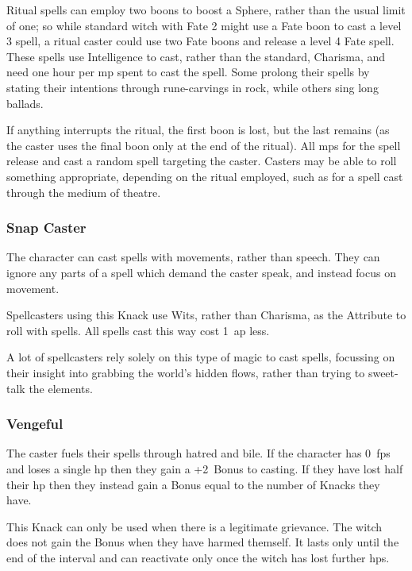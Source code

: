 \begin{multicols}{2}
Ritual spells can employ two \glspl{boon} to boost a Sphere, rather than the usual limit of one; so while standard \gls{witch} with Fate 2 might use a Fate \gls{boon} to cast a level 3 spell, a ritual caster could use two Fate \glspl{boon} and release a level 4 Fate spell.
These spells use Intelligence to cast, rather than the standard, Charisma, and need one hour per \gls{mp} spent to cast the spell.
Some prolong their spells by stating their intentions through rune-carvings in rock, while others sing long ballads.

If anything interrupts the ritual, the first \gls{boon} is lost, but the last remains (as the caster uses the final \gls{boon} only at the end of the ritual).
All \glspl{mp} for the spell release and cast a random spell targeting the caster.
Casters may be able to roll something appropriate, depending on the ritual employed, such as  for a spell cast through the medium of theatre.

\subsubsection{Snap Caster}
\label{snapCaster}

The character can cast spells with movements, rather than speech.
They can ignore any parts of a spell which demand the caster speak, and instead focus on movement.

Spellcasters using this Knack use Wits, rather than Charisma, as the Attribute to roll with spells.
All spells cast this way cost 1~\gls{ap} less.

A lot of spellcasters rely solely on this type of magic to cast spells, focussing on their insight into grabbing the world's hidden flows, rather than trying to sweet-talk the elements.

\subsubsection{Vengeful}

The caster fuels their spells through hatred and bile.
If the character has 0~\glspl{fp} and loses a single \gls{hp} then they gain a +2~Bonus to \gls{casting}.
If they have lost half their \gls{hp} then they instead gain a Bonus equal to the number of Knacks they have.

This Knack can only be used when there is a legitimate grievance.
The \gls{witch} does not gain the Bonus when they have harmed themself.
It lasts only until the end of the \gls{interval} and can reactivate only once the \gls{witch} has lost further \glspl{hp}.


\end{multicols}
